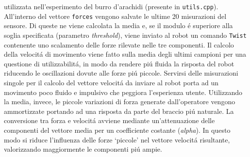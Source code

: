 utilizzata nell'esperimento del burro d'arachidi (presente in \verb|utils.cpp|).  
All'interno del vettore \verb|forces| vengono salvate le ultime 20 misurazioni del sensore. Di queste ne viene calcolata la media 
e, se il modulo \'{e} superiore alla soglia specificata (parametro \textit{threshold}), viene inviato al robot un comando 
\verb|Twist| contenente uno scalamento delle 
forze rilevate nelle tre componenti. Il calcolo della velocit\'{a} di movimento viene fatto sulla media degli ultimi campioni 
per una questione di utilizzabilit\'{a}, in modo da rendere pi\'{u} fluida la risposta del robot riducendo le oscillazioni dovute 
alle forze pi\'{u} piccole. Servirsi delle misurazioni singole 
per il calcolo del vettore velocit\'{a} da inviare al robot 
porta ad un movimento poco fluido e impulsivo che peggiora l'esperienza utente. 
Utilizzando la media, invece, le piccole variazioni 
di forza generate dall'operatore vengono ammortizzate portando ad una risposta da parte del braccio pi\'{u} naturale.
La conversione tra forza e velocit\'{a} avviene mediante un'attenuazione delle componenti del vettore media per un coefficiente 
costante (\textit{alpha}). In questo modo si riduce l'influenza delle forze `piccole' nel vettore velocit\'{a} risultante, valorizzando maggiormente le 
componenti pi\'{u} ampie. 
